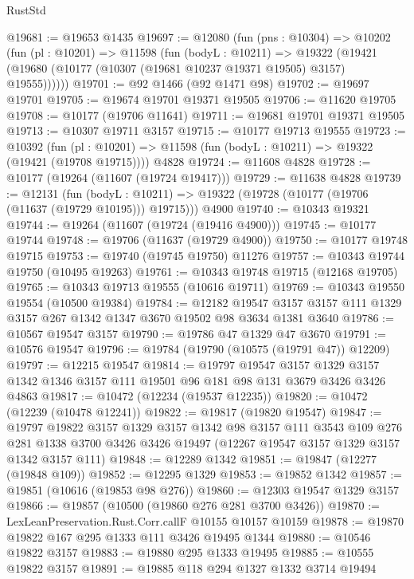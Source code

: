 \begin{lexlean}{RustStd}
\begin{coremodule}
@19681 := @19653 @1435
@19697 := @12080
    (fun (pns : @10304) =>
    @10202
      (fun (pl : @10201) =>
      @11598
        (fun (bodyL : @10211) =>
        @19322 (@19421 (@19680 (@10177 (@10307 (@19681 @10237 @19371 @19505) @3157) @19555))))))
@19701 := @92 @1466 (@92 @1471 @98)
@19702 := @19697 @19701
@19705 := @19674 @19701 @19371 @19505
@19706 := @11620 @19705
@19708 := @10177 (@19706 @11641)
@19711 := @19681 @19701 @19371 @19505
@19713 := @10307 @19711 @3157
@19715 := @10177 @19713 @19555
@19723 := @10392
    (fun (pl : @10201) => @11598 (fun (bodyL : @10211) => @19322 (@19421 (@19708 @19715))))
    @4828
@19724 := @11608 @4828
@19728 := @10177 (@19264 (@11607 (@19724 @19417)))
@19729 := @11638 @4828
@19739 := @12131
    (fun (bodyL : @10211) => @19322 (@19728 (@10177 (@19706 (@11637 (@19729 @10195))) @19715)))
    @4900
@19740 := @10343 @19321
@19744 := @19264 (@11607 (@19724 (@19416 @4900)))
@19745 := @10177 @19744
@19748 := @19706 (@11637 (@19729 @4900))
@19750 := @10177 @19748 @19715
@19753 := @19740 (@19745 @19750) @11276
@19757 := @10343 @19744 @19750 (@10495 @19263)
@19761 := @10343 @19748 @19715 (@12168 @19705)
@19765 := @10343 @19713 @19555 (@10616 @19711)
@19769 := @10343 @19550 @19554 (@10500 @19384)
@19784 := @12182
    @19547
    @3157
    @3157
    @111
    @1329
    @3157
    @267
    @1342
    @1347
    @3670
    @19502
    @98
    @3634
    @1381
    @3640
@19786 := @10567 @19547 @3157
@19790 := @19786 @47 @1329 @47 @3670
@19791 := @10576 @19547
@19796 := @19784 (@19790 (@10575 (@19791 @47)) @12209)
@19797 := @12215 @19547
@19814 := @19797
    @19547
    @3157
    @1329
    @3157
    @1342
    @1346
    @3157
    @111
    @19501
    @96
    @181
    @98
    @131
    @3679
    @3426
    @3426
    @4863
@19817 := @10472 (@12234 (@19537 @12235))
@19820 := @10472 (@12239 (@10478 @12241))
@19822 := @19817 (@19820 @19547)
@19847 := @19797
    @19822
    @3157
    @1329
    @3157
    @1342
    @98
    @3157
    @111
    @3543
    @109
    @276
    @281
    @1338
    @3700
    @3426
    @3426
    @19497
    (@12267 @19547 @3157 @1329 @3157 @1342 @3157 @111)
@19848 := @12289 @1342
@19851 := @19847 (@12277 (@19848 @109))
@19852 := @12295 @1329
@19853 := @19852 @1342
@19857 := @19851 (@10616 (@19853 @98 @276))
@19860 := @12303 @19547 @1329 @3157
@19866 := @19857 (@10500 (@19860 @276 @281 @3700 @3426))
@19870 := LexLeanPreservation.Rust.Corr.callF @10155 @10157 @10159
@19878 := @19870 @19822 @167 @295 @1333 @111 @3426 @19495 @1344
@19880 := @10546 @19822 @3157
@19883 := @19880 @295 @1333 @19495
@19885 := @10555 @19822 @3157
@19891 := @19885 @118 @294 @1327 @1332 @3714 @19494

\end{coremodule}
\end{lexlean}
